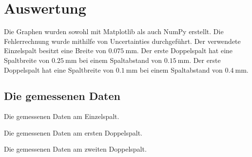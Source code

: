 \section{Auswertung}
\label{sec:Auswertung}


Die Graphen wurden sowohl mit Matplotlib \cite{matplotlib} als auch NumPy \cite{numpy} erstellt. Die
Fehlerrechnung wurde mithilfe von Uncertainties \cite{uncertainties} durchgeführt.
Der verwendete Einzelspalt besitzt eine Breite von $\SI{0.075}{\milli\meter}$. Der erste Doppelspalt
 hat eine Spaltbreite von $\SI{0.25}{\milli\meter}$ bei einem Spaltabstand von $\SI{0.15}{\milli\meter}$.
 Der erste Doppelspalt
 hat eine Spaltbreite von $\SI{0.1}{\milli\meter}$ bei einem Spaltabstand von $\SI{0.4}{\milli\meter}$.
\subsection{Die gemessenen Daten}
\begin{table}
 \centering
 \caption{Die gemessenen Daten am Einzelspalt.}
 
 \label{tab:einzel}
\end{table}

\begin{table}
 \centering
 \caption{Die gemessenen Daten am ersten Doppelspalt.}
 
 \label{tab:ds12}
 
\end{table}

\begin{table}
 \centering
 \caption{Die gemessenen Daten am zweiten Doppelspalt.}
 
 \label{tab:ds2}
 
\end{table}

